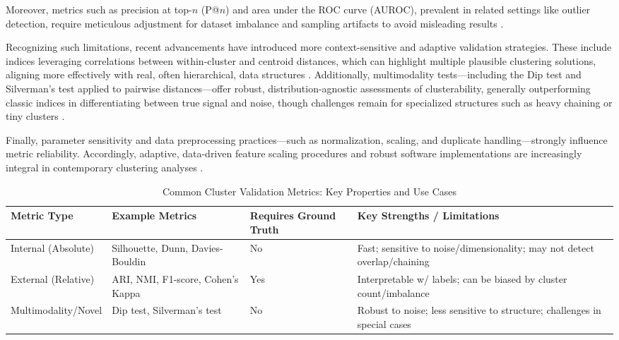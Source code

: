 Moreover, metrics such as precision at top-$n$ (P@$n$) and area under the ROC curve (AUROC), prevalent in related settings like outlier detection, require meticulous adjustment for dataset imbalance and sampling artifacts to avoid misleading results \cite{ref14}.

Recognizing such limitations, recent advancements have introduced more context-sensitive and adaptive validation strategies. These include indices leveraging correlations between within-cluster and centroid distances, which can highlight multiple plausible clustering solutions, aligning more effectively with real, often hierarchical, data structures \cite{ref17}. Additionally, multimodality tests—including the Dip test and Silverman’s test applied to pairwise distances—offer robust, distribution-agnostic assessments of clusterability, generally outperforming classic indices in differentiating between true signal and noise, though challenges remain for specialized structures such as heavy chaining or tiny clusters \cite{ref94,ref95}.

Finally, parameter sensitivity and data preprocessing practices—such as normalization, scaling, and duplicate handling—strongly influence metric reliability. Accordingly, adaptive, data-driven feature scaling procedures and robust software implementations are increasingly integral in contemporary clustering analyses \cite{ref95,ref96}.

\begin{table*}[htbp]
\centering
\caption{Common Cluster Validation Metrics: Key Properties and Use Cases}
\label{tab:validation_metrics}
\begin{adjustbox}{max width=\textwidth}
\begin{tabular}{llll}
\toprule
\textbf{Metric Type} & \textbf{Example Metrics} & \textbf{Requires Ground Truth} & \textbf{Key Strengths / Limitations} \\
\midrule
Internal (Absolute)  & Silhouette, Dunn, Davies-Bouldin & No  & Fast; sensitive to noise/dimensionality; may not detect overlap/chaining \\
External (Relative)  & ARI, NMI, F1-score, Cohen's Kappa & Yes & Interpretable w/ labels; can be biased by cluster count/imbalance        \\
Multimodality/Novel  & Dip test, Silverman's test         & No  & Robust to noise; less sensitive to structure; challenges in special cases \\
\bottomrule
\end{tabular}
\end{adjustbox}
\end{table*}

